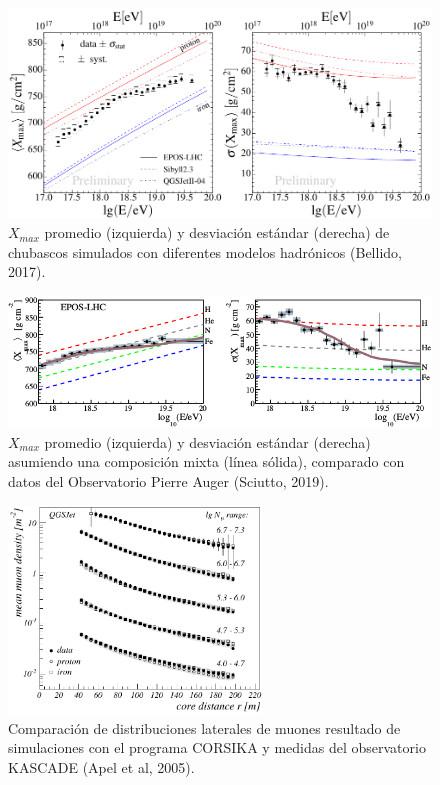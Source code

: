 \documentclass[11pt,table,compress]{beamer}
\begin{document}
	\begin{frame}
		\begin{figure}
		\centering
		\includegraphics[width=\textwidth]{Figuras/Xmax_Bellido} 
		\caption{$X_{max}$ promedio (izquierda) y desviación estándar (derecha) de chubascos simulados con diferentes modelos hadrónicos (Bellido, 2017).}
		\end{figure}	
	\end{frame}

	\begin{frame}
		\begin{figure}
		\centering
		\includegraphics[width=\textwidth]{Figuras/Xmax_PAO} 
		\caption{$X_{max}$ promedio (izquierda) y desviación estándar (derecha) asumiendo una composición mixta (línea sólida), comparado con datos del Observatorio Pierre Auger (Sciutto, 2019).}
		\end{figure}	
	\end{frame}
	
	\begin{frame}
		\begin{figure}[]
		\centering
		\includegraphics[width=0.6\textwidth]{Figuras/Apel2005} 
		\caption{Comparación de distribuciones laterales de muones resultado de simulaciones con el programa CORSIKA y medidas del observatorio KASCADE (Apel et al, 2005).}
		\label{fig:Apel}
		\end{figure}
	\end{frame}
	
\end{document}

